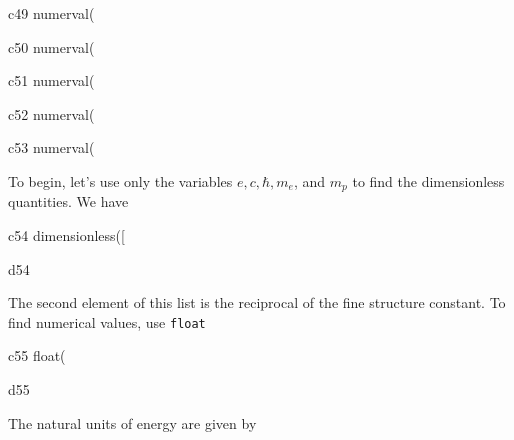 \documentclass[12pt]{article}
\begin{document}
\begin{mcline}{c49}
numerval(%
\end{mcline}

\begin{mcline}{c50}
numerval(%
\end{mcline}

\begin{mcline}{c51}
numerval(%
\end{mcline}

\begin{mcline}{c52}
numerval(%
\end{mcline}

\begin{mcline}{c53}
numerval(%
\end{mcline}


\vspace{0.1in}

\noindent To begin, let's use only the variables $e, c, \hbar, m_e$, and
$m_p$ to find the dimensionless quantities.  We have

\begin{mcline}{c54}
dimensionless([%
\end{mcline}

\begin{mdline}{d54}
\end{mdline}


\vspace{0.1in}

\noindent The second element of this list is the reciprocal of the fine 
structure constant. To find numerical values, use {\tt float}

\vspace{0.1in}

\begin{mcline}{c55}
float(%
\end{mcline}

\begin{mdline}{d55}
\end{mdline}


\vspace{0.1in}

The natural units of energy are given by
\end{document}
